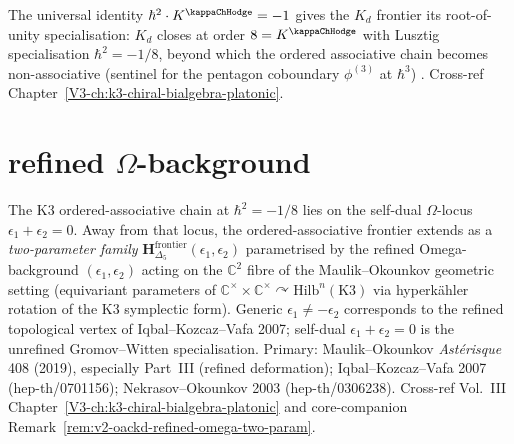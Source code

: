 \begin{remark}
\label{rem:oackdf-2}
The universal identity $\hbar^2 \cdot K^{\kappaChHodge} = -1$
gives the $K_d$ frontier its root-of-unity specialisation:
$K_d$ closes at order $8 = K^{\kappaChHodge}$ with Lusztig
specialisation $\hbar^2 = -1/8$, beyond which the ordered associative
chain becomes non-associative (sentinel for the pentagon coboundary
$\phi^{(3)}$ at $\hbar^3$)
\cite{Lusztig1990,EtingofKazhdan2007PartV}. Cross-ref
Chapter~\ref{V3-ch:k3-chiral-bialgebra-platonic}.
\end{remark}

\section{refined \texorpdfstring{$\Omega$}{Omega}-background}
\label{sec:oackdf-supplement-ii}

\begin{remark}
\label{rem:oackdf-refined-omega}
The K3 ordered-associative chain at $\hbar^2 = -1/8$ lies on
the self-dual $\Omega$-locus $\epsilon_1 + \epsilon_2 = 0$. Away from
that locus, the ordered-associative frontier extends as a
\emph{two-parameter family}
$\mathbf H_{\Delta_5}^{\mathrm{frontier}}(\epsilon_1, \epsilon_2)$
parametrised by the refined Omega-background $(\epsilon_1, \epsilon_2)$
acting on the $\mathbb C^2$ fibre of the Maulik--Okounkov geometric
setting (equivariant parameters of $\mathbb C^\times \times
\mathbb C^\times \curvearrowright \mathrm{Hilb}^n(\mathrm{K3})$ via
hyperk\"ahler rotation of the K3 symplectic form). Generic
$\epsilon_1 \neq -\epsilon_2$ corresponds to the refined topological
vertex of Iqbal--Kozcaz--Vafa 2007; self-dual
$\epsilon_1 + \epsilon_2 = 0$ is the unrefined Gromov--Witten
specialisation. Primary: Maulik--Okounkov \emph{Ast\'erisque} 408
(2019), especially Part~III (refined deformation); Iqbal--Kozcaz--Vafa
2007 (hep-th/0701156); Nekrasov--Okounkov 2003 (hep-th/0306238).
Cross-ref Vol.~III Chapter~\ref{V3-ch:k3-chiral-bialgebra-platonic} and
core-companion Remark~\ref{rem:v2-oackd-refined-omega-two-param}.
\end{remark}

